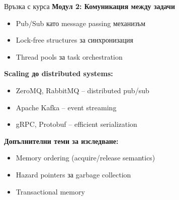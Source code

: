 \documentclass[aspectratio=169]{beamer}
\begin{document}
\begin{frame}{Връзка с курса}
\textbf{Модул 2: Комуникация между задачи}

\begin{itemize}
    \item Pub/Sub като message passing механизъм
    \item Lock-free structures за синхронизация
    \item Thread pools за task orchestration
\end{itemize}

\vspace{0.5cm}

\textbf{Scaling до distributed systems:}
\begin{itemize}
    \item ZeroMQ, RabbitMQ – distributed pub/sub
    \item Apache Kafka – event streaming
    \item gRPC, Protobuf – efficient serialization
\end{itemize}

\vspace{0.5cm}

\textbf{Допълнителни теми за изследване:}
\begin{itemize}
    \item Memory ordering (acquire/release semantics)
    \item Hazard pointers за garbage collection
    \item Transactional memory
\end{itemize}
\end{frame}
\end{document}
